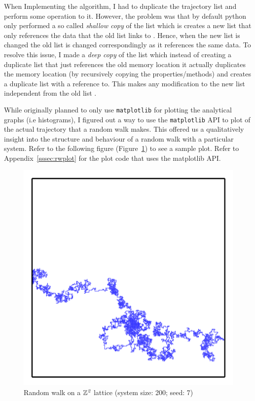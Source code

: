 \documentclass{article}
\begin{document}
When Implementing the algorithm, I had to duplicate the trajectory list and perform some operation to it. However, the problem was that by default python only performed a so called \emph{shallow copy} of the list which is creates a new list that only references the data that the old list links to \cite{DPscopy2016}. Hence, when the new list is changed the old list is changed correspondingly as it references the same data. To resolve this issue, I made a \emph{deep copy} of the list which instead of creating a duplicate list that just references the old memory location it actually duplicates the memory location (by recursively copying the properties/methods) and creates a duplicate list with a reference to. This makes any modification to the new list independent from the old list \cite{DPscopy2016}.

While originally planned to only use \texttt{matplotlib} for plotting the analytical graphs (i.e histograms), I figured out a way to use the \texttt{matplotlib} API to plot of the actual trajectory that a random walk makes. This offered us a qualitatively insight into the structure and behaviour of a random walk with a particular system. Refer to the following figure (Figure~\ref{fig:RW}) to see a sample plot. Refer to Appendix~\ref{sssec:rwplot} for the plot code that uses the matplotlib API.
\begin{figure}[H]
	\begin{center}
		\includegraphics[scale=1.6]{RW_200s7hdpi}
		\caption{Random walk on a $\mathbb{Z}^{\emph{2}}$ lattice (system size: 200; seed: 7)}
		\label{fig:RW}
	\end{center}
\end{figure}
\end{document}
